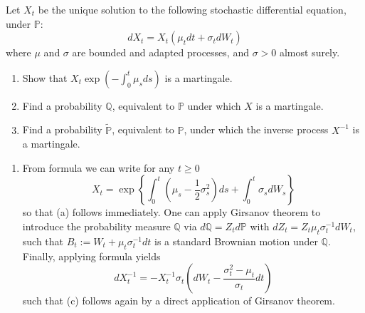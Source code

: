 \documentclass[12pt,a4paper]{exam}
\begin{document}
\begin{questions}
\question Let $X_t$ be the unique solution to the following stochastic differential equation, under $\mathbb{P}$:
\begin{equation*}
dX_t = X_t(\mu_t dt + \sigma_t dW_t)
\end{equation*}
where $\mu$ and $\sigma$ are bounded and adapted processes, and $\sigma >0$ almost surely.
\begin{enumerate}[label=(\alph*),font=\itshape]
\item Show that $X_t\exp(-\int_0^t \mu_s ds)$ is a martingale.
\item Find a probability $\mathbb{Q}$, equivalent to $\mathbb{P}$ under which $X$ is a martingale.
\item Find a probability $\tilde{\mathbb{P}}$, equivalent to $\mathbb{P}$, under which the inverse process $X^{-1}$ is a martingale.
\end{enumerate}
\fillwithlines{3cm}
\begin{solution}
\begin{enumerate}[label=(\alph*),font=\itshape]
\item From \ito formula we can write for any $t\geq 0$
\begin{equation*}
X_t = \exp\left\{\int_0^t\left(\mu_s - \frac{1}{2}\sigma_s^2\right)ds + \int_0^t\sigma_s dW_s\right\}
\end{equation*}
so that (a) follows immediately. One can apply Girsanov theorem to introduce the probability measure $\mathbb{Q}$ via $d\mathbb{Q}=Z_t d\mathbb{P}$ with $dZ_t = Z_t\mu_t \sigma_t^{-1}dW_t$, such that $B_t := W_t +\mu_t\sigma^{-1}_t dt$ is a standard Brownian motion under $\mathbb{Q}$.
Finally, applying \ito formula yields
\begin{equation*}
dX^{-1}_t = -X^{-1}_t \sigma_t  \left( dW_t - \frac{\sigma_t^2 - \mu_t}{\sigma_t}dt\right)
\end{equation*}
such that (c) follows again by a direct application of Girsanov theorem.
\end{enumerate}
\end{solution}


\end{questions}
\end{document}
